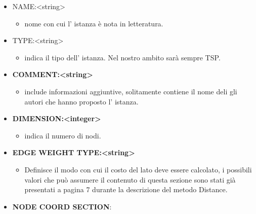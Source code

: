 \documentclass[11pt]{article}
\begin{document}
\begin{itemize}
    \item NAME:<string> 
    \begin{itemize}
    \item nome con cui l' istanza è nota in letteratura.
    \end{itemize}
    \item TYPE:<string>
    
    \begin{itemize}     
    \item indica il tipo dell' istanza. Nel nostro ambito sarà sempre TSP.    
    \end{itemize}    
     
    \item \textbf{COMMENT:<string>} 
    \begin{itemize}    
    \item include informazioni aggiuntive, solitamente contiene il nome deli gli autori che hanno proposto l'                  istanza.
    \end{itemize}    
    
        
    \item \textbf{DIMENSION:<integer>} 
    \begin{itemize}
    \item indica il numero di nodi.
    \end{itemize}    
    
    \item \textbf{EDGE WEIGHT TYPE:<string>}
    \begin{itemize} 
    \item Definisce il modo con cui il costo del lato deve essere calcolato, i possibili valori  che può assumere                 il contenuto di questa sezione sono stati già presentati a pagina 7 durante la descrizione del metodo Distance.
    \end{itemize}    
    
    \item \textbf{NODE COORD SECTION}: 
    \begin{itemize}    
    

\end{itemize}
\end{itemize}
\end{document}
